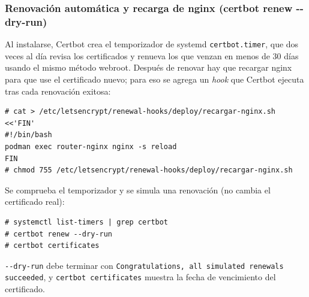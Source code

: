 \subsubsection{Renovación automática y recarga de nginx (certbot renew -{}-dry-run)}
Al instalarse, Certbot crea el temporizador de systemd \texttt{certbot.timer}, que dos veces al día revisa los certificados y renueva los que venzan en menos de 30 días usando el mismo método webroot. Después de renovar hay que recargar nginx para que use el certificado nuevo; para eso se agrega un \emph{hook} que Certbot ejecuta tras cada renovación exitosa:
\begin{lstlisting}
# cat > /etc/letsencrypt/renewal-hooks/deploy/recargar-nginx.sh <<'FIN'
#!/bin/bash
podman exec router-nginx nginx -s reload
FIN
# chmod 755 /etc/letsencrypt/renewal-hooks/deploy/recargar-nginx.sh
\end{lstlisting}
Se comprueba el temporizador y se simula una renovación (no cambia el certificado real):
\begin{lstlisting}
# systemctl list-timers | grep certbot
# certbot renew --dry-run
# certbot certificates
\end{lstlisting}
\texttt{-{}-dry-run} debe terminar con \texttt{Congratulations, all simulated renewals succeeded}, y \texttt{certbot certificates} muestra la fecha de vencimiento del certificado.
